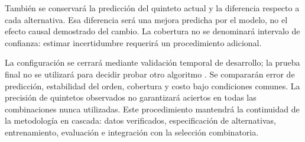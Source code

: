 También se conservará la predicción del quinteto actual y la diferencia respecto a cada alternativa. Esa diferencia será una mejora predicha por el modelo, no el efecto causal demostrado del cambio. La cobertura no se denominará intervalo de confianza: estimar incertidumbre requerirá un procedimiento adicional.

La configuración se cerrará mediante validación temporal de desarrollo; la prueba final no se utilizará para decidir probar otro algoritmo \cite{cawley2010selection}. Se compararán error de predicción, estabilidad del orden, cobertura y costo bajo condiciones comunes. La precisión de quintetos observados no garantizará aciertos en todas las combinaciones nunca utilizadas. Este procedimiento mantendrá la continuidad de la metodología en cascada: datos verificados, especificación de alternativas, entrenamiento, evaluación e integración con la selección combinatoria.

\endgroup
